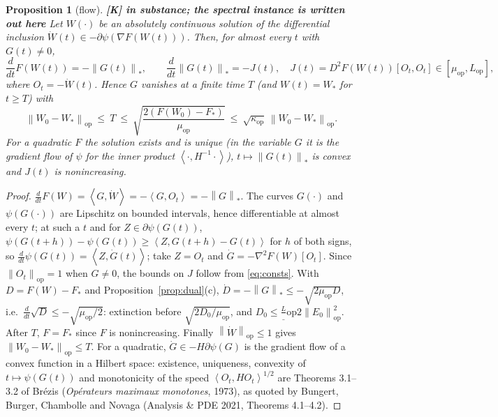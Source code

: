 \documentclass[11pt]{article}
\newtheorem{proposition}[theorem]{Proposition}
\theoremstyle{definition}
\theoremstyle{remark}
\newcommand{\nop}[1]{\left\|#1\right\|_{\mathrm{op}}}
\newcommand{\nnuc}[1]{\left\|#1\right\|_{*}}
\newcommand{\inner}[2]{\left\langle #1, #2 \right\rangle}
\newcommand{\Lop}{L_{\mathrm{op}}}
\newcommand{\muop}{\mu_{\mathrm{op}}}
\newcommand{\kop}{\kappa_{\mathrm{op}}}
\begin{document}
\begin{proposition}[flow]\label{prop:flow} \textbf{[K] in substance; the spectral instance is written out here}
Let $W(\cdot)$ be an absolutely continuous solution of the differential inclusion
$\dot W(t)\in-\partial\psi(\nabla F(W(t)))$. Then, for almost every $t$ with $G(t)\ne0$,
\[
\frac{d}{dt}F(W(t))=-\nnuc{G(t)},\qquad \frac{d}{dt}\nnuc{G(t)}=-J(t),\quad
J(t)=D^2F(W(t))[O_t,O_t]\in[\muop,\Lop],
\]
where $O_t=-\dot W(t)$. Hence $G$ vanishes at a finite time $T$ (and $W(t)=W_\ast$ for $t\ge T$) with
\begin{equation}\label{eq:sandwich}
\nop{W_0-W_\ast}\ \le\ T\ \le\ \sqrt{\frac{2(F(W_0)-F_\ast)}{\muop}}\ \le\ \sqrt{\kop}\,\nop{W_0-W_\ast}.
\end{equation}
For a quadratic $F$ the solution exists and is unique (in the variable $G$ it is the gradient flow of $\psi$ for the
inner product $\inner\cdot{H^{-1}\cdot}$), $t\mapsto\nnuc{G(t)}$ is convex and $J(t)$ is nonincreasing.
\end{proposition}
\begin{proof}
$\frac d{dt}F(W)=\inner G{\dot W}=-\inner G{O_t}=-\nnuc G$. The curves $G(\cdot)$ and $\psi(G(\cdot))$ are Lipschitz on
bounded intervals, hence differentiable at almost every $t$; at such a $t$ and for $Z\in\partial\psi(G(t))$,
$\psi(G(t+h))-\psi(G(t))\ge\inner Z{G(t+h)-G(t)}$ for $h$ of both signs, so $\frac d{dt}\psi(G(t))=\inner Z{\dot G(t)}$;
take $Z=O_t$ and $\dot G=-\nabla^2F(W)[O_t]$. Since $\nop{O_t}=1$ when $G\ne0$, the bounds on $J$ follow from
\eqref{eq:consts}. With $D=F(W)-F_\ast$ and Proposition~\ref{prop:dual}(c), $\dot D=-\nnuc G\le-\sqrt{2\muop D}$, i.e.\
$\frac d{dt}\sqrt D\le-\sqrt{\muop/2}$: extinction before $\sqrt{2D_0/\muop}$, and $D_0\le\frac\Lop2\nop{E_0}^2$. After
$T$, $F=F_\ast$ since $F$ is nonincreasing. Finally $\nop{\dot W}\le1$ gives $\nop{W_0-W_\ast}\le T$. For a quadratic,
$\dot G\in-H\partial\psi(G)$ is the gradient flow of a convex function in a Hilbert space: existence, uniqueness,
convexity of $t\mapsto\psi(G(t))$ and monotonicity of the speed $\inner{O_t}{HO_t}^{1/2}$ are Theorems 3.1--3.2 of
Br\'ezis (\emph{Op\'erateurs maximaux monotones}, 1973), as quoted by Bungert, Burger, Chambolle and Novaga
(Analysis \& PDE 2021, Theorems 4.1--4.2).
\end{proof}
\end{document}
